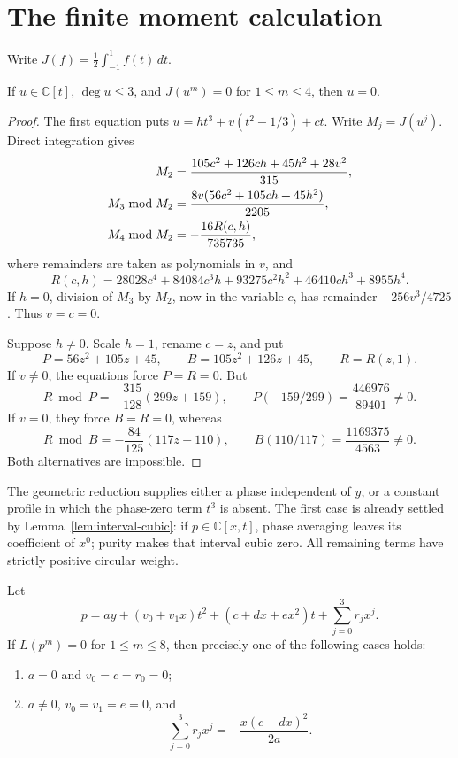 \section{The finite moment calculation}\label{sec:finite}

Write \(J(f)=\frac12\int_{-1}^1 f(t)\,dt\).

\begin{lemma}
\label{lem:interval-cubic}
If \(u\in\mathbb C[t]\), \(\deg u\le3\), and
\(J(u^m)=0\) for \(1\le m\le4\), then \(u=0\).
\end{lemma}

\begin{proof}
The first equation puts
\(u=h t^3+v(t^2-1/3)+ct\). Write \(M_j=J(u^j)\). Direct integration gives
\begin{align}
 M_2&=\frac{105c^2+126ch+45h^2+28v^2}{315},\notag\\
 M_3\bmod M_2&=\frac{8v(56c^2+105ch+45h^2)}{2205},\notag\\
 M_4\bmod M_2&=-\frac{16R(c,h)}{735735},
 \label{eq:interval-cubic-remainders}
\end{align}
where remainders are taken as polynomials in \(v\), and
\[
 R(c,h)=28028c^4+84084c^3h+93275c^2h^2+46410ch^3+8955h^4.
\]
If \(h=0\), division of \(M_3\) by \(M_2\), now in the variable
\(c\), has remainder \(-256v^3/4725\). Thus \(v=c=0\).

Suppose \(h\ne0\). Scale \(h=1\), rename \(c=z\), and put
\[
 P=56z^2+105z+45,\qquad B=105z^2+126z+45,\qquad R=R(z,1).
\]
If \(v\ne0\), the equations force \(P=R=0\). But
\[
 R\bmod P=-\frac{315}{128}(299z+159),\qquad
 P(-159/299)=\frac{446976}{89401}\ne0.
\]
If \(v=0\), they force \(B=R=0\), whereas
\[
 R\bmod B=-\frac{84}{125}(117z-110),\qquad
 B(110/117)=\frac{1169375}{4563}\ne0.
\]
Both alternatives are impossible.
\end{proof}

The geometric reduction supplies either a phase independent of \(y\),
or a constant profile in which the phase-zero term \(t^3\) is absent.
The first case is already settled by Lemma~\ref{lem:interval-cubic}:
if \(p\in\mathbb C[x,t]\), phase averaging leaves its coefficient of
\(x^0\); purity makes that interval cubic zero. All remaining terms
have strictly positive circular weight.

\begin{proposition}
\label{prop:finite}
Let
\begin{equation}
 p=ay+(v_0+v_1x)t^2+(c+dx+ex^2)t+\sum_{j=0}^3r_jx^j.
 \label{eq:constant-profile-family}
\end{equation}
If \(L(p^m)=0\) for \(1\le m\le8\), then precisely one of the
following cases holds:
\begin{enumerate}
\item \(a=0\) and \(v_0=c=r_0=0\);
\item \(a\ne0\), \(v_0=v_1=e=0\), and
\begin{equation}
 \sum_{j=0}^3r_jx^j=-\frac{x(c+dx)^2}{2a}.
 \label{eq:constant-profile-shear}
\end{equation}
\end{enumerate}
\end{proposition}

